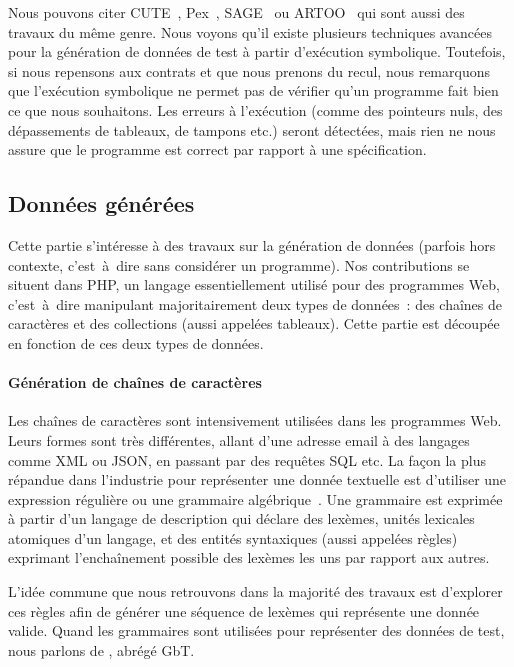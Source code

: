 Nous pouvons citer CUTE~, Pex~,
SAGE~ ou ARTOO~ qui sont aussi des
travaux du même genre. Nous voyons qu'il existe plusieurs techniques avancées
pour la génération de données de test à partir d'exécution symbolique.
Toutefois, si nous repensons aux contrats et que nous prenons du recul, nous
remarquons que l'exécution symbolique ne permet pas de vérifier qu'un programme
fait bien ce que nous souhaitons. Les erreurs à l'exécution (comme des pointeurs
nuls, des dépassements de tableaux, de tampons etc.) seront détectées, mais rien
ne nous assure que le programme est correct par rapport à une spécification.

\subsection{Données générées}

Cette partie s'intéresse à des travaux sur la génération de données (parfois
hors contexte, c'est~à~dire sans considérer un programme). Nos contributions se
situent dans PHP, un langage essentiellement utilisé pour des programmes Web,
c'est~à~dire manipulant majoritairement deux types de données~: des chaînes de
caractères et des collections (aussi appelées tableaux). Cette partie est
découpée en fonction de ces deux types de données.

\paragraph{Génération de chaînes de caractères} Les chaînes de caractères sont
intensivement utilisées dans les programmes Web. Leurs formes sont très
différentes, allant d'une adresse email à des langages comme XML ou JSON, en
passant par des requêtes SQL etc. La façon la plus répandue dans l'industrie
pour représenter une donnée textuelle est d'utiliser une expression régulière ou
une grammaire algébrique~. Une grammaire est exprimée à partir
d'un {\strong langage de description} qui déclare des {\strong lexèmes}, unités
lexicales atomiques d'un langage, et des {\strong entités syntaxiques} (aussi
appelées {\strong règles}) exprimant l'enchaînement possible des lexèmes les uns
par rapport aux autres.

L'idée commune que nous retrouvons dans la majorité des travaux est d'explorer
ces règles afin de générer une {\strong séquence de lexèmes} qui représente une
donnée valide. Quand les grammaires sont utilisées pour représenter des données
de test, nous parlons de , abrégé GbT.

